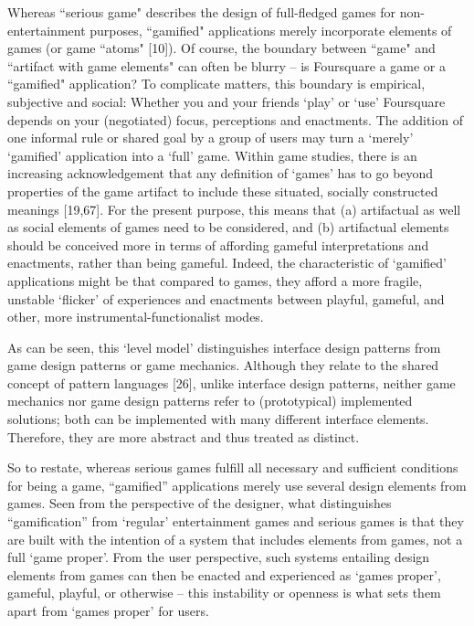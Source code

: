 Whereas ``serious game" describes the design of full-fledged games for non-entertainment purposes, ``gamified" applications merely incorporate elements of games (or game ``atoms" [10]). Of course, the boundary between ``game" and ``artifact with game elements" can often be blurry – is Foursquare a game or a ``gamified" application? To complicate matters, this boundary is empirical, subjective and social: Whether you and your friends `play' or `use' Foursquare depends on your (negotiated) focus, perceptions and enactments. The addition of one informal rule or shared goal by a group of users may turn a `merely' `gamified' application into a `full' game. Within game studies, there is an increasing acknowledgement that any definition of `games' has to go beyond properties of the game artifact to include these situated, socially constructed meanings [19,67]. For the present purpose, this means that (a) artifactual as well as social elements of games need to be considered, and (b) artifactual elements should be conceived more in terms of affording gameful interpretations and enactments, rather than being gameful. Indeed, the characteristic of `gamified' applications might be that compared to games, they afford a more fragile, unstable `flicker' of experiences and enactments between playful, gameful, and other, more instrumental-functionalist modes.


As can be seen, this ‘level model’ distinguishes interface design patterns from game design patterns or game mechanics. Although they relate to the shared concept of pattern languages [26], unlike interface design patterns, neither game mechanics nor game design patterns refer to (prototypical) implemented solutions; both can be implemented with many different interface elements. Therefore, they are more abstract and thus treated as distinct.

So to restate, whereas serious games fulfill all necessary and sufficient conditions for being a game, “gamified” applications merely use several design elements from games. Seen from the perspective of the designer, what distinguishes “gamification” from ‘regular’ entertainment games and serious games is that they are built with the intention of a system that includes elements from games, not a full ‘game proper’. From the user perspective, such systems entailing design elements from games can then be enacted and experienced as ‘games proper’, gameful, playful, or otherwise – this instability or openness is what sets them apart from ‘games proper’ for users.

